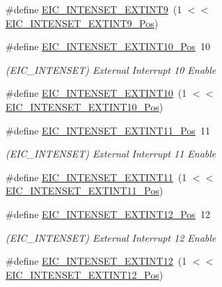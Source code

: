 \begin{DoxyCompactItemize}
\#define \mbox{\hyperlink{group___s_a_m_d21___e_i_c_ga02bbfeab64c9ed0a9f3c75bcd4cb4bcb}{E\+I\+C\+\_\+\+I\+N\+T\+E\+N\+S\+E\+T\+\_\+\+E\+X\+T\+I\+N\+T9}}~(1 $<$$<$ \mbox{\hyperlink{group___s_a_m_d21___e_i_c_gacbcf0bfa1d72884f7c63f2c7c3e2d0c1}{E\+I\+C\+\_\+\+I\+N\+T\+E\+N\+S\+E\+T\+\_\+\+E\+X\+T\+I\+N\+T9\+\_\+\+Pos}})
\item 
\#define \mbox{\hyperlink{group___s_a_m_d21___e_i_c_gaec53134c4daed24a7102c8e81445f46a}{E\+I\+C\+\_\+\+I\+N\+T\+E\+N\+S\+E\+T\+\_\+\+E\+X\+T\+I\+N\+T10\+\_\+\+Pos}}~10
\begin{DoxyCompactList}\small\item\em (E\+I\+C\+\_\+\+I\+N\+T\+E\+N\+S\+ET) External Interrupt 10 Enable \end{DoxyCompactList}\item 
\#define \mbox{\hyperlink{group___s_a_m_d21___e_i_c_ga214a5fbdf6ecfa3e5b01de933a10945a}{E\+I\+C\+\_\+\+I\+N\+T\+E\+N\+S\+E\+T\+\_\+\+E\+X\+T\+I\+N\+T10}}~(1 $<$$<$ \mbox{\hyperlink{group___s_a_m_d21___e_i_c_gaec53134c4daed24a7102c8e81445f46a}{E\+I\+C\+\_\+\+I\+N\+T\+E\+N\+S\+E\+T\+\_\+\+E\+X\+T\+I\+N\+T10\+\_\+\+Pos}})
\item 
\#define \mbox{\hyperlink{group___s_a_m_d21___e_i_c_ga5d177c44fc3866d2d14278aa95afd447}{E\+I\+C\+\_\+\+I\+N\+T\+E\+N\+S\+E\+T\+\_\+\+E\+X\+T\+I\+N\+T11\+\_\+\+Pos}}~11
\begin{DoxyCompactList}\small\item\em (E\+I\+C\+\_\+\+I\+N\+T\+E\+N\+S\+ET) External Interrupt 11 Enable \end{DoxyCompactList}\item 
\#define \mbox{\hyperlink{group___s_a_m_d21___e_i_c_ga690c989e8eaf5f994ac8c4c9950dd440}{E\+I\+C\+\_\+\+I\+N\+T\+E\+N\+S\+E\+T\+\_\+\+E\+X\+T\+I\+N\+T11}}~(1 $<$$<$ \mbox{\hyperlink{group___s_a_m_d21___e_i_c_ga5d177c44fc3866d2d14278aa95afd447}{E\+I\+C\+\_\+\+I\+N\+T\+E\+N\+S\+E\+T\+\_\+\+E\+X\+T\+I\+N\+T11\+\_\+\+Pos}})
\item 
\#define \mbox{\hyperlink{group___s_a_m_d21___e_i_c_gad1186bcac46ea1ece7e61bdc5810bed5}{E\+I\+C\+\_\+\+I\+N\+T\+E\+N\+S\+E\+T\+\_\+\+E\+X\+T\+I\+N\+T12\+\_\+\+Pos}}~12
\begin{DoxyCompactList}\small\item\em (E\+I\+C\+\_\+\+I\+N\+T\+E\+N\+S\+ET) External Interrupt 12 Enable \end{DoxyCompactList}\item 
\#define \mbox{\hyperlink{group___s_a_m_d21___e_i_c_ga2c74d132ab3b5bc4ad5c6013ac8694e5}{E\+I\+C\+\_\+\+I\+N\+T\+E\+N\+S\+E\+T\+\_\+\+E\+X\+T\+I\+N\+T12}}~(1 $<$$<$ \mbox{\hyperlink{group___s_a_m_d21___e_i_c_gad1186bcac46ea1ece7e61bdc5810bed5}{E\+I\+C\+\_\+\+I\+N\+T\+E\+N\+S\+E\+T\+\_\+\+E\+X\+T\+I\+N\+T12\+\_\+\+Pos}})

\end{DoxyCompactItemize}
